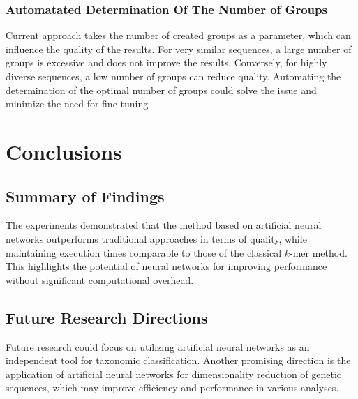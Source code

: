 \documentclass[pdflatex,sn-vancouver-num]{sn-jnl}%
\begin{document}
            \subsubsection{Automatated Determination Of The Number of Groups}
                Current approach takes the number of created groups as a parameter, which can influence the quality of the results. For very similar sequences, a large number of groups is excessive and does not improve the results. Conversely, for highly diverse sequences, a low number of groups can reduce quality. Automating the determination of the optimal number of groups could solve the issue and minimize the need for fine-tuning 

    \section{Conclusions}
        \subsection{Summary of Findings}
            The experiments demonstrated that the method based on artificial neural networks outperforms traditional approaches in terms of quality, while maintaining execution times comparable to those of the classical $k$-mer method. This highlights the potential of neural networks for improving performance without significant computational overhead.

        \subsection{Future Research Directions}
            Future research could focus on utilizing artificial neural networks as an independent tool for taxonomic classification. Another promising direction is the application of artificial neural networks for dimensionality reduction of genetic sequences, which may improve efficiency and performance in various analyses.


    \backmatter


    
\end{document}
